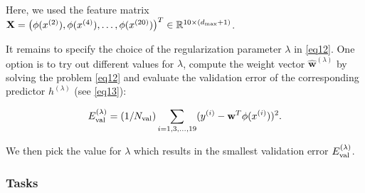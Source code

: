 \documentclass[11pt]{article}
\begin{document}
Here, we used the feature matrix
\(\mathbf{X} = \big(\phi(x^{(2)}),\phi(x^{(4)}),\ldots,\phi(x^{(20)}) \big)^{T} \in \mathbb{R}^{10 \times (d_{\rm max}+1)}\).

It remains to specify the choice of the regularization parameter
\(\lambda\) in \eqref{eq12}. One option is to try out different values
for \(\lambda\), compute the weight vector
\(\hat{\mathbf{w}}^{(\lambda)}\) by solving the problem \eqref{eq12} and
evaluate the validation error of the corresponding predictor
\(h^{(\lambda)}\) (see \eqref{eq13}):

\begin{equation}
E_{\rm val}^{(\lambda)} = (1/N_{\rm val}) \sum_{i=1,3,\ldots,19} (y^{(i)} - \mathbf{w}^{T} \phi(x^{(i)}))^{2}.
\end{equation}

We then pick the value for \(\lambda\) which results in the smallest
validation error \(E_{\rm val}^{(\lambda)}\).

\subsubsection{Tasks}\label{tasks}
\end{document}
